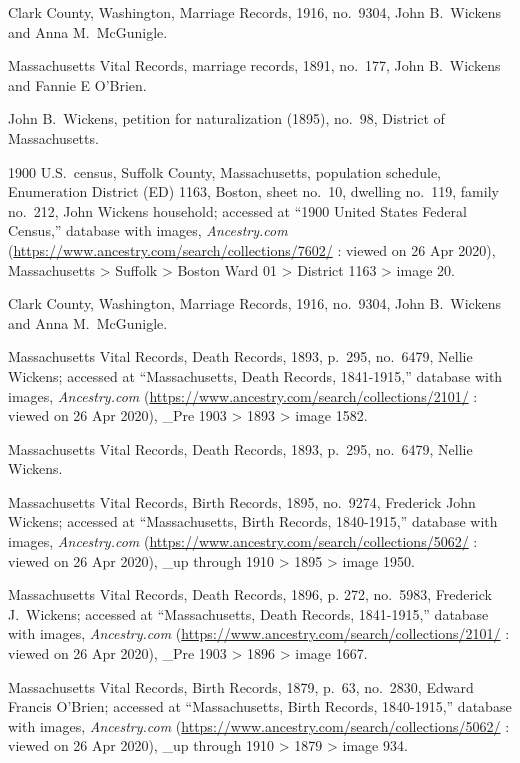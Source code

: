 \begin{thebibliography}{999}
Clark County, Washington, Marriage Records, 1916, no.\ 9304, John B.\ Wickens and Anna M.\ McGunigle.

Massachusetts Vital Records, marriage records, 1891, no.\ 177, John B.\ Wickens and Fannie E O'Brien.

John B.\ Wickens, petition for naturalization (1895), no.\ 98, District of Massachusetts.

1900 U.S.\ census, Suffolk County, Massachusetts, population schedule, Enumeration District (ED) 1163,  Boston, sheet no.\ 10, dwelling no.\ 119, family no.\ 212, John Wickens household; accessed at ``1900 United States Federal Census,'' database with images, \textit{Ancestry.com} (\url{https://www.ancestry.com/search/collections/7602/} : viewed on 26 Apr 2020), Massachusetts > Suffolk > Boston Ward 01 > District 1163 > image 20.

Clark County, Washington, Marriage Records, 1916, no.\ 9304, John B.\ Wickens and Anna M.\ McGunigle.

Massachusetts Vital Records, Death Records, 1893, p.\ 295, no.\ 6479, Nellie Wickens; accessed at ``Massachusetts, Death Records, 1841-1915,'' database with images, \textit{Ancestry.com} (\url{https://www.ancestry.com/search/collections/2101/} : viewed on 26 Apr 2020), \_Pre 1903 > 1893 > image 1582.

Massachusetts Vital Records, Death Records, 1893, p.\ 295, no.\ 6479, Nellie Wickens.

Massachusetts Vital Records, Birth Records, 1895, no.\ 9274, Frederick John Wickens; accessed at ``Massachusetts, Birth Records, 1840-1915,'' database with images, \textit{Ancestry.com} (\url{https://www.ancestry.com/search/collections/5062/} : viewed on 26 Apr 2020), \_up through 1910 > 1895 > image 1950.

Massachusetts Vital Records, Death Records, 1896, p. 272, no.\ 5983, Frederick J.\ Wickens; accessed at ``Massachusetts, Death Records, 1841-1915,'' database with images, \textit{Ancestry.com} (\url{https://www.ancestry.com/search/collections/2101/} : viewed on 26 Apr 2020), \_Pre 1903 > 1896 > image 1667.


Massachusetts Vital Records, Birth Records, 1879, p.\ 63, no.\ 2830, Edward Francis O'Brien; accessed at ``Massachusetts, Birth Records, 1840-1915,'' database with images, \textit{Ancestry.com} (\url{https://www.ancestry.com/search/collections/5062/} : viewed on 26 Apr 2020), \_up through 1910 > 1879 > image 934.


\end{thebibliography}
